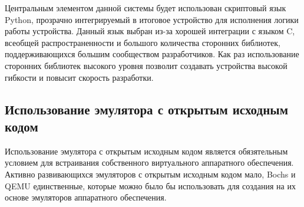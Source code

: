 Центральным элементом данной системы будет использован скриптовый язык Python, прозрачно интегрируемый
в итоговое устройство для исполнения логики работы устройства.
Данный язык выбран из-за хорошей интеграции с языком C, всеобщей распространенности и большого
количества сторонних библиотек, поддерживающихся большим сообществом разработчиков.
Как раз использование сторонних библиотек высокого уровня позволит создавать устройства
высокой гибкости и повысит скорость разработки.


%
%
%
%
%
%
%
\subsection{Использование эмулятора с открытым исходным кодом}\label{sec:ch1/sec4/sub2}

Использование эмулятора с открытым исходным кодом является обязятельным
условием для встраивания собственного виртуального аппаратного обеспечения.
Активно развивающихся эмуляторов с открытым исходным кодом мало, Bochs и QEMU
единственные, которые можно было бы использовать для создания на их основе
эмуляторов аппаратного обеспечения.


